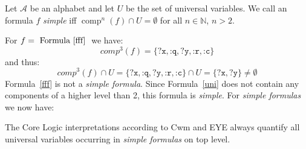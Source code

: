 


\begin{definition}
Let $\mathcal{A}$ be an \nthree alphabet and let $U$ be the set of universal %
variables.
We call an \nthree formula $f$ \emph{simple} iff  $\operatorname{comp}^n(f)\cap U =\emptyset$ %
for all $n \in \mathbb{N}$, $n>2$.
\end{definition}

For $f=\text{ Formula~\ref{fff} }$ we have:  \[\textit{comp}^3(f)=\{\texttt{?x}, \texttt{:q}, \texttt{?y}, \texttt{:r}, \texttt{:c}\}\]
and thus:
\[\textit{comp}^3(f)\cap U=\{\texttt{?x}, \texttt{:q}, \texttt{?y}, \texttt{:r}, \texttt{:c}\}\cap U = \{\texttt{?x}, \texttt{?y}\}\neq \emptyset\]
Formula~\ref{fff} is not a \emph{simple formula}. Since Formula~\ref{uni} does not contain any components of a higher level than 2, this formula is \emph{simple}.
For \emph{simple formulas} we now have:

\begin{lemma}
The \nthree Core Logic interpretations according to Cwm and EYE always quantify all universal variables occurring in \emph{simple formulas} on top level. 
\end{lemma}


